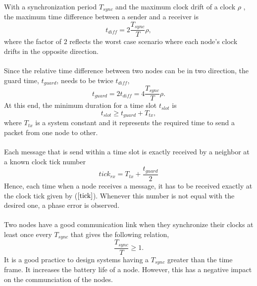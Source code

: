 \documentclass[a4paper,10pt]{report}
\begin{document}
\paragraph*{}
With a synchronization period $T_{sync}$ and the maximum clock drift of a clock $\rho$ , the maximum time difference between a sender and a receiver is
\begin{equation}
t_{diff} = 2\frac{T_{sync}}{T}\rho ,
\end{equation}
where the factor of $2$ reflects the worst case scenario where each node's clock drifts in the opposite direction.
\paragraph*{}
Since the relative time difference between two nodes can be in two direction, the guard time, $t_{guard}$, needs to be twice $t_{diff}$,
\begin{equation}
t_{guard}= 2t_{diff} = 4\frac{T_{sync}}{T}\rho.
\end{equation}
At this end, the minimum duration for a time slot $t_{slot}$ is
\begin{equation}
t_{slot} \geq t_{guard} + T_{tx},
\end{equation}
where $T_{tx}$ is a system constant and it represents the required time to send a packet from one node to other.
\paragraph*{} Each message that is send within a time slot is exactly received by a neighbor at a known clock tick number
\begin{equation}
tick_{rx} = T_{tx}+ \frac{t_{guard}}{2} \label{tick}
\end{equation}
Hence, each time when a node receives a message, it has to be received exactly at the clock tick given by ($\ref{tick}$). Whenever
this number is not equal with the desired one, a phase error is observed.
\paragraph*{}
Two nodes have a good communication link when they synchronize their clocks at least once every $T_{sync}$ that gives the following
relation,
\begin{equation}
\frac{T_{sync}}{T}\geq 1.
\end{equation}
It is a good practice to design systems having a $T_{sync}$ greater than the time frame. It increases the battery life of a node. However,
this has a negative impact on the communciation of the nodes.
\end{document}
